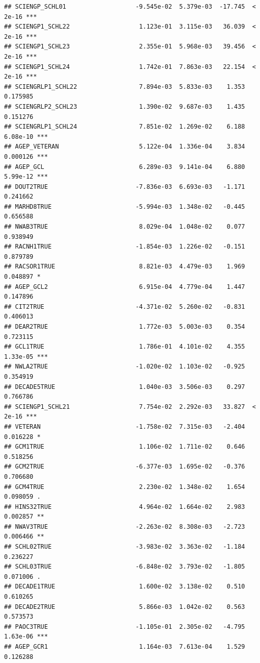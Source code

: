 \documentclass[
]{article}
\begin{document}
\begin{verbatim}
## SCIENGP_SCHL01                   -9.545e-02  5.379e-03  -17.745  < 2e-16 ***
## SCIENGP1_SCHL22                   1.123e-01  3.115e-03   36.039  < 2e-16 ***
## SCIENGP1_SCHL23                   2.355e-01  5.968e-03   39.456  < 2e-16 ***
## SCIENGP1_SCHL24                   1.742e-01  7.863e-03   22.154  < 2e-16 ***
## SCIENGRLP1_SCHL22                 7.894e-03  5.833e-03    1.353 0.175985    
## SCIENGRLP2_SCHL23                 1.390e-02  9.687e-03    1.435 0.151276    
## SCIENGRLP1_SCHL24                 7.851e-02  1.269e-02    6.188 6.08e-10 ***
## AGEP_VETERAN                      5.122e-04  1.336e-04    3.834 0.000126 ***
## AGEP_GCL                          6.289e-03  9.141e-04    6.880 5.99e-12 ***
## DOUT2TRUE                        -7.836e-03  6.693e-03   -1.171 0.241662    
## MARHD8TRUE                       -5.994e-03  1.348e-02   -0.445 0.656588    
## NWAB3TRUE                         8.029e-04  1.048e-02    0.077 0.938949    
## RACNH1TRUE                       -1.854e-03  1.226e-02   -0.151 0.879789    
## RACSOR1TRUE                       8.821e-03  4.479e-03    1.969 0.048897 *  
## AGEP_GCL2                         6.915e-04  4.779e-04    1.447 0.147896    
## CIT2TRUE                         -4.371e-02  5.260e-02   -0.831 0.406013    
## DEAR2TRUE                         1.772e-03  5.003e-03    0.354 0.723115    
## GCL1TRUE                          1.786e-01  4.101e-02    4.355 1.33e-05 ***
## NWLA2TRUE                        -1.020e-02  1.103e-02   -0.925 0.354919    
## DECADE5TRUE                       1.040e-03  3.506e-03    0.297 0.766786    
## SCIENGP1_SCHL21                   7.754e-02  2.292e-03   33.827  < 2e-16 ***
## VETERAN                          -1.758e-02  7.315e-03   -2.404 0.016228 *  
## GCM1TRUE                          1.106e-02  1.711e-02    0.646 0.518256    
## GCM2TRUE                         -6.377e-03  1.695e-02   -0.376 0.706680    
## GCM4TRUE                          2.230e-02  1.348e-02    1.654 0.098059 .  
## HINS32TRUE                        4.964e-02  1.664e-02    2.983 0.002857 ** 
## NWAV3TRUE                        -2.263e-02  8.308e-03   -2.723 0.006466 ** 
## SCHL02TRUE                       -3.983e-02  3.363e-02   -1.184 0.236227    
## SCHL03TRUE                       -6.848e-02  3.793e-02   -1.805 0.071006 .  
## DECADE1TRUE                       1.600e-02  3.138e-02    0.510 0.610265    
## DECADE2TRUE                       5.866e-03  1.042e-02    0.563 0.573573    
## PAOC3TRUE                        -1.105e-01  2.305e-02   -4.795 1.63e-06 ***
## AGEP_GCR1                         1.164e-03  7.613e-04    1.529 0.126288    

\end{verbatim}
\end{document}
